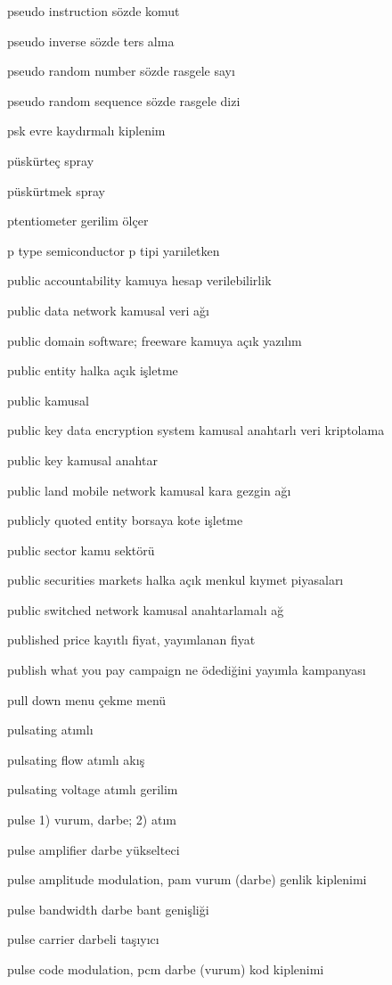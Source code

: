 \documentclass[12pt,fleqn]{article}\usepackage{../../common}
\begin{document}
pseudo instruction sözde komut

pseudo inverse sözde ters alma

pseudo random number sözde rasgele sayı

pseudo random sequence sözde rasgele dizi

psk evre kaydırmalı kiplenim

püskürteç spray

püskürtmek spray

ptentiometer gerilim ölçer

p type semiconductor p tipi yarıiletken

public accountability kamuya hesap verilebilirlik

public data network kamusal veri ağı

public domain software; freeware kamuya açık yazılım

public entity halka açık işletme

public kamusal

public key data encryption system kamusal anahtarlı veri kriptolama

public key kamusal anahtar

public land mobile network kamusal kara gezgin ağı

publicly quoted entity borsaya kote işletme

public sector kamu sektörü

public securities markets halka açık menkul kıymet piyasaları

public switched network kamusal anahtarlamalı ağ

published price kayıtlı fiyat, yayımlanan fiyat

publish what you pay campaign ne ödediğini yayımla kampanyası

pull down menu çekme menü

pulsating atımlı

pulsating flow atımlı akış

pulsating voltage atımlı gerilim

pulse 1) vurum, darbe; 2) atım

pulse amplifier darbe yükselteci

pulse amplitude modulation, pam vurum (darbe) genlik kiplenimi

pulse bandwidth darbe bant genişliği

pulse carrier darbeli taşıyıcı

pulse code modulation, pcm darbe (vurum) kod kiplenimi
\end{document}
